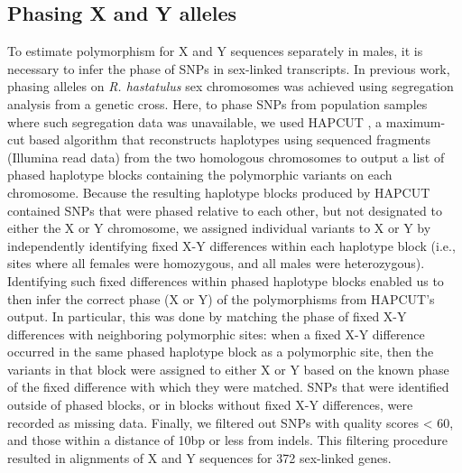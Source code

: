 \documentclass[9pt,twocolumn,twoside]{gsajnl}
\begin{document}
\subsection*{Phasing X and Y alleles}
To estimate polymorphism for X and Y sequences separately in males, it is necessary to infer the phase of SNPs in sex-linked transcripts. In previous work, phasing alleles on \textit{R. hastatulus} sex chromosomes was achieved using segregation analysis from a genetic cross. Here, to phase SNPs from population samples where such segregation data was unavailable, we used HAPCUT \citep{bansal2008hapcut}, a maximum-cut based algorithm that reconstructs haplotypes using sequenced fragments (Illumina read data) from the two homologous chromosomes to output a list of phased haplotype blocks containing the polymorphic variants on each chromosome. Because the resulting haplotype blocks produced by HAPCUT contained SNPs that were phased relative to each other, but not designated to either the X or Y chromosome, we assigned individual variants to X or Y by independently identifying fixed X-Y differences within each haplotype block (i.e., sites where all females were homozygous, and all males were heterozygous). Identifying such fixed differences within phased haplotype blocks enabled us to then infer the correct phase (X or Y) of the polymorphisms from HAPCUT’s output. In particular, this was done by matching the phase of fixed X-Y differences with neighboring polymorphic sites: when a fixed X-Y difference occurred in the same phased haplotype block as a polymorphic site, then the variants in that block were assigned to either X or Y based on the known phase of the fixed difference with which they were matched. SNPs that were identified outside of phased blocks, or in blocks without fixed X-Y differences, were recorded as missing data. Finally, we filtered out SNPs with quality scores < 60, and those within a distance of 10bp or less from indels. This filtering procedure resulted in alignments of X and Y sequences for 372 sex-linked genes.
\end{document}
